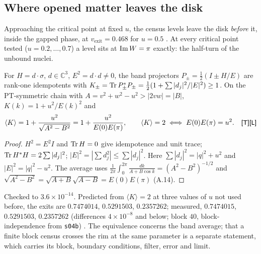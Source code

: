 \subsection{Where opened matter leaves the disk}
Approaching the critical point at fixed $u$, the census levels leave the disk \emph{before} it, inside the gapped phase, at $v_{\mathrm{exit}}=0.468$ for $u=0.5$ . At every critical point tested ($u=0.2,\dots,0.7$) a level sits at $\operatorname{Im} W=\pi$ exactly: the half-turn of the unbound nuclei.

\begin{proposition}\label{prop:petermann}
For $H=d\cdot\sigma$, $d\in\mathbb C^3$, $E^2=d\cdot d\neq0$, the band projectors $P_\pm=\tfrac12(I\pm H/E)$ are rank-one idempotents with $K_\pm=\operatorname{Tr} P_\pm^*P_\pm=\tfrac12(1+\sum|d_j|^2/|E|^2)\ge1$. On the PT-symmetric chain with $A=v^2+w^2-u^2>|2vw|=|B|$, $K(k)=1+u^2/E(k)^2$ and
\[
\langle K\rangle=1+\frac{u^2}{\sqrt{A^2-B^2}}=1+\frac{u^2}{E(0)E(\pi)},\qquad\langle K\rangle=2\iff E(0)E(\pi)=u^2. \quad\textsf{\small[T]}\textsf{\small[L]}
\]
\end{proposition}
\begin{proof}
$H^2=E^2I$ and $\operatorname{Tr} H=0$ give idempotence and unit trace; $\operatorname{Tr} H^*H=2\sum|d_j|^2$; $|E|^2=|\sum d_j^2|\le\sum|d_j|^2$. Here $\sum|d_j|^2=|q|^2+u^2$ and $|E|^2=|q|^2-u^2$. The average uses $\frac1{2\pi}\int_0^{2\pi}\frac{dk}{A+B\cos k}=(A^2-B^2)^{-1/2}$ and $\sqrt{A^2-B^2}=\sqrt{A+B}\sqrt{A-B}=E(0)E(\pi)$ (A.14).
\end{proof}
Checked to $3.6\times10^{-14}$. Predicted from $\langle K\rangle=2$ at three values of $u$ not used before, the exits are $0.7474014$, $0.5291503$, $0.2357262$; measured, $0.7474015$, $0.5291503$, $0.2357262$ (differences $4\times10^{-8}$ and below; block $40$, block-independence from \texttt{s04b}) . The equivalence concerns the band average; that a finite block census crosses the rim at the same parameter is a separate statement, which carries its block, boundary conditions, filter, error and limit.

